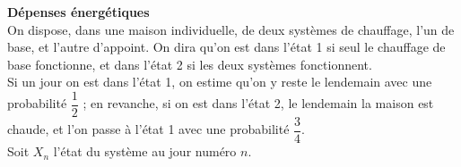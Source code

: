 \documentclass[11pt, answers]{exam}
\def \P {\mathbb P}
\begin{document}
\begin{questions}
\question \textbf{Dépenses énergétiques} \\
On dispose, dans une maison individuelle, de deux systèmes de chauffage, l'un de base, et l'autre d'appoint. On dira qu'on est dans l'état 1 si seul le chauffage de base fonctionne, et dans l'état 2 si les deux systèmes fonctionnent. \\
Si un jour on est dans l'état 1, on estime qu'on y reste le lendemain avec une probabilité $\dfrac{1}{2}$ ; en revanche, si on est dans l'état 2, le lendemain la maison est chaude, et l'on passe à l'état 1 avec une probabilité $\dfrac{3}{4}$. \\
Soit $X_n$ l'état du système au jour numéro $n$.
\begin{parts}

\end{parts}
\end{questions}
\end{document}
